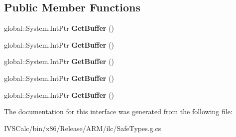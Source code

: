\subsection*{Public Member Functions}
\begin{DoxyCompactItemize}
\item 
\mbox{\label{interface_system_1_1_runtime_1_1_interop_services_1_1_windows_runtime_1_1_i_buffer_byte_access__8aad8629c9e3be1462b5ca3f6b1769da_af7f40676a85381d45d9cddff0eb690c8}} 
global\+::\+System.\+Int\+Ptr {\bfseries Get\+Buffer} ()
\item 
\mbox{\label{interface_system_1_1_runtime_1_1_interop_services_1_1_windows_runtime_1_1_i_buffer_byte_access__8aad8629c9e3be1462b5ca3f6b1769da_af7f40676a85381d45d9cddff0eb690c8}} 
global\+::\+System.\+Int\+Ptr {\bfseries Get\+Buffer} ()
\item 
\mbox{\label{interface_system_1_1_runtime_1_1_interop_services_1_1_windows_runtime_1_1_i_buffer_byte_access__8aad8629c9e3be1462b5ca3f6b1769da_af7f40676a85381d45d9cddff0eb690c8}} 
global\+::\+System.\+Int\+Ptr {\bfseries Get\+Buffer} ()
\item 
\mbox{\label{interface_system_1_1_runtime_1_1_interop_services_1_1_windows_runtime_1_1_i_buffer_byte_access__8aad8629c9e3be1462b5ca3f6b1769da_af7f40676a85381d45d9cddff0eb690c8}} 
global\+::\+System.\+Int\+Ptr {\bfseries Get\+Buffer} ()
\item 
\mbox{\label{interface_system_1_1_runtime_1_1_interop_services_1_1_windows_runtime_1_1_i_buffer_byte_access__8aad8629c9e3be1462b5ca3f6b1769da_af7f40676a85381d45d9cddff0eb690c8}} 
global\+::\+System.\+Int\+Ptr {\bfseries Get\+Buffer} ()
\end{DoxyCompactItemize}


The documentation for this interface was generated from the following file\+:\begin{DoxyCompactItemize}
\item 
I\+V\+S\+Calc/bin/x86/\+Release/\+A\+R\+M/ilc/Safe\+Types.\+g.\+cs\end{DoxyCompactItemize}

